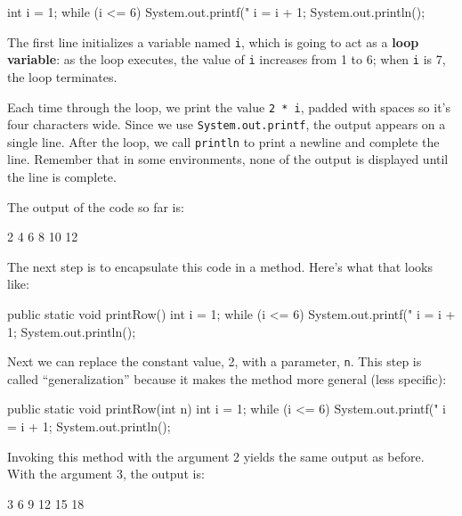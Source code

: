 \documentclass[12pt]{book}
\theoremstyle{exercise}
\newcommand{\java}[1]{\verb"#1"}
\newcommand{\java}[1]{\lstinline{#1}} %
\begin{document}
\begin{code}
    int i = 1;
    while (i <= 6) {
        System.out.printf("%
        i = i + 1;
    }
    System.out.println();
\end{code}


The first line initializes a variable named \java{i}, which is going to act as a {\bf loop variable}: as the loop executes, the value of \java{i} increases from 1 to 6; when \java{i} is 7, the loop terminates.

Each time through the loop, we print the value \java{2 * i}, padded with spaces so it's four characters wide.
Since we use \java{System.out.printf}, the output appears on a single line.
After the loop, we call \java{println} to print a newline and complete the line.
Remember that in some environments, none of the output is displayed until the line is complete.

The output of the code so far is:

\begin{stdout}
    2    4    6    8   10   12
\end{stdout}


The next step is to encapsulate this code in a method.
Here's what that looks like:

\begin{code}
    public static void printRow() {
        int i = 1;
        while (i <= 6) {
            System.out.printf("%
            i = i + 1;
        }
        System.out.println();
    }
\end{code}

Next we can replace the constant value, 2, with a parameter, \java{n}.
This step is called ``generalization'' because it makes the method more general (less specific):

\begin{code}
    public static void printRow(int n) {
        int i = 1;
        while (i <= 6) {
            System.out.printf("%
            i = i + 1;
        }
        System.out.println();
    }
\end{code}

Invoking this method with the argument 2 yields the same output as before.
With the argument 3, the output is:

\begin{stdout}
    3    6    9   12   15   18
\end{stdout}
\end{document}
